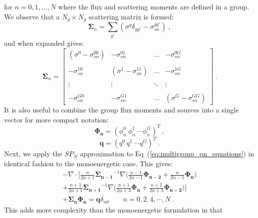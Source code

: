 for $n = 0,1,\dotsc,N$ where the flux and scattering moments are
defined in a group. We observe that a $N_g \times N_g$ scattering
matrix is formed:
\begin{equation}
  \mathbf{\Sigma}_n =
  \sum_{g'}(\sigma^g\delta_{gg'}-\sigma^{gg'}_{sn})\:,
  \label{eq:scattering_matrix}
\end{equation}
and when expanded gives:
\begin{equation}
  \mathbf{\Sigma}_n =
  \begin{bmatrix}
    (\sigma^0-\sigma_{sn}^{00}) & -\sigma_{sn}^{01} & \dots &
    -\sigma_{sn}^{0G} \\ &&&\\ -\sigma_{sn}^{10} &
    (\sigma^1-\sigma_{sn}^{11}) & \dots & -\sigma_{sn}^{1G}
    \\ &&&\\ \vdots & \vdots & \ddots & \vdots
    \\ &&&\\ -\sigma_{sn}^{G0} & -\sigma_{sn}^{G1} & \dots &
    (\sigma^G-\sigma_{sn}^{GG})
  \end{bmatrix}\:.
\end{equation}
It is also useful to combine the group flux moments and sources into a
single vector for more compact notation:
\begin{equation}
  \mathbf{\Phi_n} = (\phi^0_n\ \phi^1_n\ \cdots \phi^G_n )^T\:, 
  \label{eq:group_flux_vector}
\end{equation}
\begin{equation}
  \mathbf{q} = (q^0\ q^1\ \cdots q^G )^T\:.
  \label{eq:group_source_vector}
\end{equation}
Next, we apply the $SP_N$ approximation to
Eq~(\ref{eq:multigroup_pn_equations}) in identical fashion to the
monoenergetic case. This gives:
\begin{multline}
  -\nabla \cdot \Bigg[\frac{n}{2n+1}\mathbf{\Sigma_{n-1}}^{-1} \nabla
    \Big(\frac{n-1}{2n-1} \mathbf{\Phi_{n-2}} +
    \frac{n}{2n-1}\mathbf{\Phi_n} \Big) \\+
    \frac{n+1}{2n+1}\mathbf{\Sigma_{n+1}}^{-1} \nabla
    \Big(\frac{n+1}{2n+3}\mathbf{\Phi_n} +
    \frac{n+2}{2n+3}\mathbf{\Phi_{n+2}}\Big) \Bigg] \\+
  \mathbf{\Sigma_n} \mathbf{\Phi_n} = \mathbf{q}
  \delta_{n0}\ \ \ \ \ \ \ \ \ n = 0,2,4,\cdots,N\:.
  \label{eq:multigroup_spn_equations}
\end{multline}
This adds more complexity than the monoenergetic formulation in that
